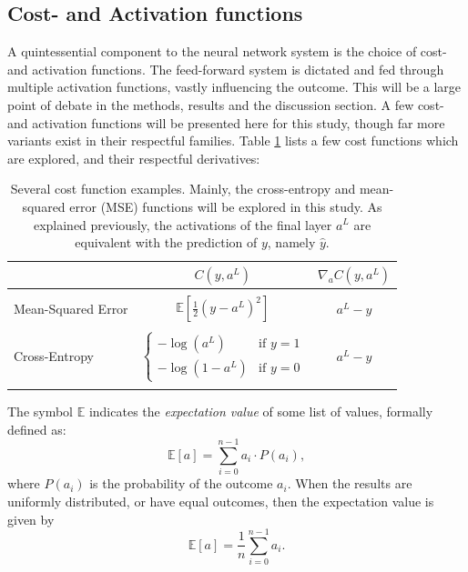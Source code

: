     \subsection{Cost- and Activation functions}
        A quintessential component to the neural network system is the choice of cost- and activation functions. The feed-forward system is dictated and fed through multiple activation functions, vastly influencing the outcome. This will be a large point of debate in the methods, results and the discussion section. A few cost- and activation functions will be presented here for this study, though far more variants exist in their respectful families. Table \ref{tab:cost_functions} lists a few cost functions which are explored, and their respectful derivatives:
        \begin{table}[H]
            \centering
            \begin{tabular}[t]{l@{\hskip 0.1in}c@{\hskip 0.1in}c}
                \toprule
                 & $C(y, a^L)$ & $\nabla_aC(y, a^L)$\\
                \midrule
                 &  & \\
                Mean-Squared Error & $\mathds{E} \left[ \frac12 (y-a^L)^2\right]$ & $a^L-y$ \\ & & \\
                Cross-Entropy & $\begin{cases}-\log(a^L) & \text{if } y=1\\ -\log(1-a^L) & \text{if } y=0\end{cases}$ & $a^L-y$ \\ & & \\
                \bottomrule
            \end{tabular}
            \caption{Several cost function examples. Mainly, the cross-entropy and mean-squared error (MSE) functions will be explored in this study. As explained previously, the activations of the final layer $a^L$ are equivalent with the prediction of $y$, namely $\hat{y}$. }
            \label{tab:cost_functions}
        \end{table}
        The symbol $\mathds{E}$ indicates the \textit{expectation value} of some list of values, formally defined as:
        \begin{equation}
            \mathds{E}\left[a\right] = \sum_{i=0}^{n-1} a_i \cdot P(a_i),
        \end{equation}
        where $P(a_i)$ is the probability of the outcome $a_i$. When the results are uniformly distributed, or have equal outcomes, then the expectation value is given by
        \begin{equation}
            \mathds{E}\left[a\right] = \frac1n\sum_{i=0}^{n-1} a_i.
        \end{equation}
